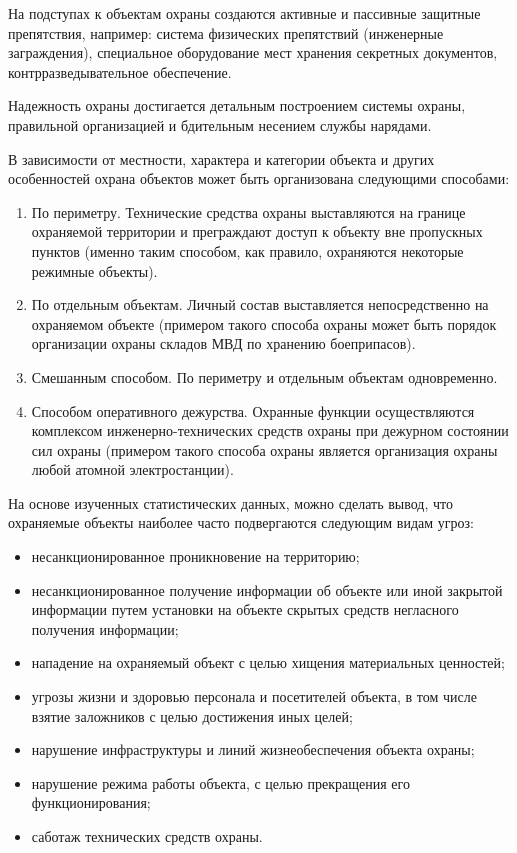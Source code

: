 На подступах к объектам охраны создаются активные и пассивные защитные препятствия, например: система физических препятствий (инженерные заграждения), специальное оборудование мест хранения секретных документов, контрразведывательное обеспечение.

Надежность охраны достигается детальным построением системы охраны, правильной организацией и бдительным несением службы нарядами.

В зависимости от местности, характера и категории объекта и других особенностей охрана объектов может быть организована следующими способами:
\begin{enumerate}[1.]
    \item По периметру. Технические средства охраны выставляются на границе охраняемой территории и преграждают доступ к объекту вне пропускных пунктов (именно таким способом, как правило, охраняются некоторые режимные объекты).
    \item По отдельным объектам. Личный состав выставляется непосредственно на охраняемом объекте (примером такого способа охраны может быть порядок организации охраны складов МВД по хранению боеприпасов).
    \item Смешанным способом. По периметру и отдельным объектам одновременно.
    \item Способом оперативного дежурства. Охранные функции осуществляются комплексом инженерно-технических средств охраны при дежурном состоянии сил охраны (примером такого способа охраны является организация охраны любой атомной электростанции).
\end{enumerate}

На основе изученных статистических данных, можно сделать вывод, что охраняемые объекты наиболее часто подвергаются следующим видам угроз:
\begin{itemize}
    \item несанкционированное проникновение на территорию;
    \item несанкционированное получение информации об объекте или иной закрытой информации путем установки на объекте скрытых средств негласного получения информации;
    \item нападение на охраняемый объект с целью хищения материальных ценностей;
    \item угрозы жизни и здоровью персонала и посетителей объекта, в том числе взятие заложников с целью достижения иных целей;
    \item нарушение инфраструктуры и линий жизнеобеспечения объекта охраны;
    \item нарушение режима работы объекта, с целью прекращения его функционирования;
    \item саботаж технических средств охраны.
\end{itemize}


